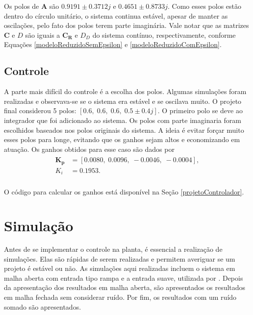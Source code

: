 Os polos de $\mathbf{A}$ são $0.9191 \pm 0.3712j$ e $
   0.4651 \pm 0.8733j$. Como esses polos estão dentro do círculo unitário, o sistema continua estável, apesar de manter as oscilações, pelo fato dos polos terem parte imaginária. Vale notar que as matrizes $\mathbf{C}$ e $D$ são iguais a $\mathbf{C_R}$ e $D_D$ do sistema contínuo, respectivamente, conforme Equações \ref{modeloReduzidoSemEpsilon} e \ref{modeloReduzidoComEpsilon}.
 
\subsection{Controle}

 A parte mais difícil do controle é a escolha dos polos. Algumas simulações foram realizadas e observava-se se o sistema era estável e se oscilava muito. O projeto final considerou 5 polos: $\left[0.6,\;0.6,\;0.6,\;0.5\pm 0.4j\right]$. O primeiro polo se deve ao integrador que foi adicionado ao sistema. Os polos com parte imaginaria foram escolhidos baseados nos polos originais do sistema. A ideia é evitar forçar muito esses polos para longe, evitando que os ganhos sejam altos e economizando em atuação. Os ganhos obtidos para esse caso são dados por \begin{align}
 \begin{array}{ll}
	 	\mathbf{K_p} &= \left[0.0080,\;0.0096,\;-0.0046,\;-0.0004\right],\\
 	K_i &= 0.1953.\\ 	
 \end{array}\label{ganhosObtidos}
 \end{align}
 
 O código para calcular os ganhos está disponível na Seção \ref{projetoControlador}.

\section{Simulação}

 Antes de se implementar o controle na planta, é essencial a realização de simulações. Elas são rápidas de serem realizadas e permitem averiguar se um projeto é estável ou não. As simulações aqui realizadas incluem o sistema em malha aberta com entrada tipo rampa e a entrada suave, utilizada por \cite{rafaelMestrado}. Depois da apresentação dos resultados em malha aberta, são apresentados os resultados em malha fechada sem considerar ruído. Por fim, os resultados com um ruído somado são apresentados.
 
